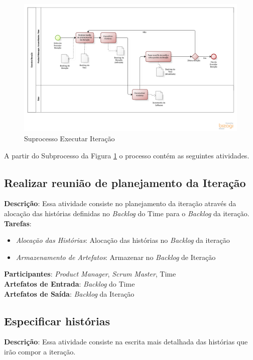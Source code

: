 \begin{figure}[!htb]
\includegraphics[scale=0.5]{figuras/iteracao.png}
\caption{Suprocesso Executar Iteração}
\label{fig:iteracao}
\end{figure}

A partir do Subprocesso da Figura \ref{fig:iteracao} o processo contém as seguintes atividades.

\subsection{Realizar reunião de planejamento da Iteração}
  \textbf{Descrição}: Essa atividade consiste no planejamento da iteração através da alocação das histórias definidas no \textit{Backlog} do Time para o \textit{Backlog} da iteração. \\

  \textbf{Tarefas}:
  \begin{itemize}
   \item \indent \textit{Alocação das Histórias}: Alocação das histórias no \textit{Backlog} da iteração

   \item \indent \textit{Armazenamento de Artefatos}: Armazenar no \textit{Backlog} de Iteração
  \end{itemize}

  \textbf{Participantes}: \textit{Product Manager}, \textit{Scrum Master}, Time\\

  \textbf{Artefatos de Entrada}: \textit{Backlog} do Time \\

  \textbf{Artefatos de Saída}:  \textit{Backlog} da Iteração\\

\subsection{Especificar histórias}
  \textbf{Descrição}: Essa atividade consiste na escrita mais detalhada das histórias que irão compor a
iteração. \\

